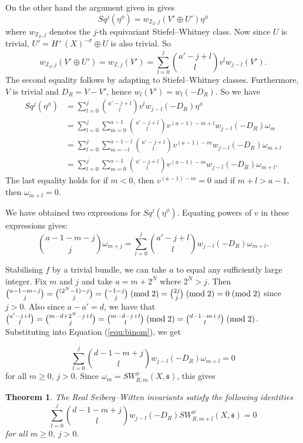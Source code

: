\documentclass{amsart}
\newtheorem{theorem}{Theorem}[section]
\theoremstyle{definition}
\theoremstyle{remark}
\numberwithin{equation}{section}
\begin{document}
On the other hand the argument given in \cite[]{bk} gives
\[
Sq^j(\eta^\phi) = w_{\mathbb{Z}_2 , j}(V' \oplus U') \eta^\phi
\]
where $w_{\mathbb{Z}_2 , j}$ denotes the $j$-th equivariant Stiefel--Whitney class. Now since $U$ is trivial, $U' = H^+(X)^{-\sigma} \oplus U$ is also trivial. So 
\[
w_{\mathbb{Z}_2,j}(V'\oplus U') = w_{\mathbb{Z},j}(V') = \sum_{l = 0}^{j} \binom{a'-j+l}{l} v^{l} w_{j-l}(V').
\]
The second equality follows by adapting \cite[Lemma 4.1]{bk} to Stiefel--Whitney classes. Furthermore, $V$ is trivial and $D_R = V - V'$, hence $w_l(V') = w_l(-D_R)$. So we have
\begin{align*}
Sq^j(\eta^\phi) &= \sum_{l=0}^j \binom{a'-j+l}{l} v^{l} w_{j-l}(-D_R) \eta^\phi \\
&= \sum_{l=0}^j \sum_{m=0}^{a-1} \binom{a'-j+l}{l} v^{(a-1)-m+l} w_{j-l}(-D_R) \omega_m \\
&= \sum_{l=0}^{j} \sum_{m = -l}^{a-1-l} \binom{a' -j +l}{l} v^{(a-1)-m} w_{j-l}(-D_R) \omega_{m+l} \\
&= \sum_{l=0}^j \sum_{m=0}^{a-1} \binom{a'-j+l}{l} v^{(a-1)-m} w_{j-l}(-D_R) \omega_{m+l}.
\end{align*}
The last equality holds for if $m < 0$, then $v^{(a-1)-m} = 0$ and if $m+l > a-1$, then $\omega_{m+l} = 0$.

We have obtained two expressions for $Sq^j(\eta^\phi)$. Equating powers of $v$ in these expressions gives:
\begin{equation}\label{equ:binom}
\binom{a-1-m-j}{j}\omega_{m+j}= \sum_{l=0}^j \binom{a'-j+l}{l} w_{j-l}(-D_R) \omega_{m+l}.
\end{equation}

Stabilising $f$ by a trivial bundle, we can take $a$ to equal any sufficiently large integer. Fix $m$ and $j$ and take $a = m + 2^N$ where $2^N > j$. Then $\binom{a-1-m-j}{j} = \binom{ (2^N-1)-j }{j} = \binom{-1-j}{j} \; ({\rm mod} \; 2) = \binom{2j}{j} \; ({\rm mod} \; 2) = 0 \; ({\rm mod} \; 2)$ since $j>0$. Also since $a-a' = d$, we have that $\binom{a'-j+l}{l} = \binom{m-d+2^N - j + l}{j} = \binom{m-d-j+l}{l} \; ({\rm mod} \; 2) = \binom{d-1-m+j}{l} \; ({\rm mod} \; 2)$. Substituting into Equation (\ref{equ:binom}), we get

\[
\sum_{l=0}^j \binom{ d-1 - m + j}{l} w_{j-l}(-D_R) \omega_{m+l} = 0
\]
for all $m \ge 0$, $j > 0$. Since $\omega_m = SW^\phi_{R,m}(X,\mathfrak{s})$, this gives

\begin{theorem}\label{thm:rswid}
The Real Seiberg--Witten invariants satisfy the following identities
\[
\sum_{l=0}^j \binom{ d-1 - m + j}{l} w_{j-l}(-D_R) SW^\phi_{R,m+l}(X,\mathfrak{s}) = 0
\]
for all $m \ge 0$, $j > 0$.
\end{theorem}
\end{document}
